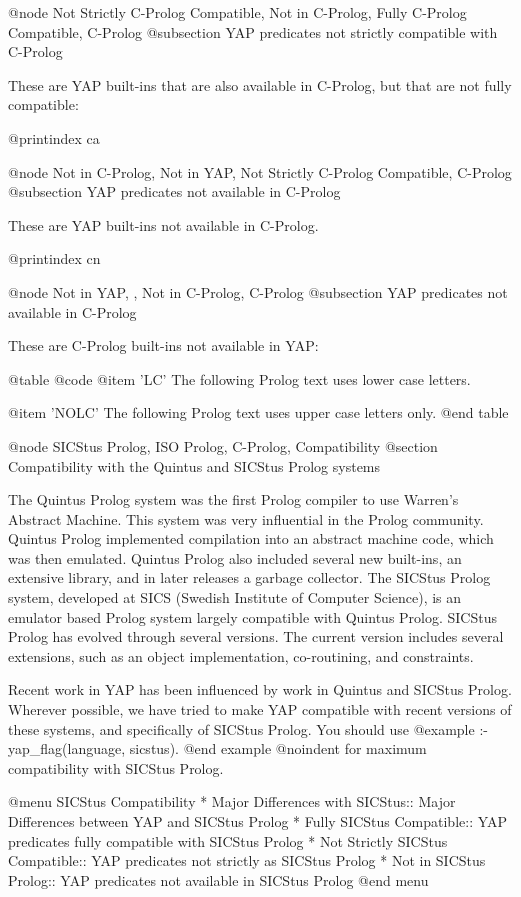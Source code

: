 {{{{{{{{{@node Not Strictly C-Prolog Compatible, Not in C-Prolog, Fully C-Prolog Compatible, C-Prolog
@subsection YAP predicates not strictly compatible with C-Prolog

These are YAP built-ins that are also available in C-Prolog, but
that are not fully compatible:

@printindex ca

@node Not in C-Prolog, Not in YAP, Not Strictly C-Prolog Compatible, C-Prolog
@subsection YAP predicates not available in C-Prolog

These are YAP built-ins not available in C-Prolog.

@printindex cn

@node Not in YAP, , Not in C-Prolog, C-Prolog
@subsection YAP predicates not available in C-Prolog

These are C-Prolog built-ins not available in YAP:

@table @code
@item 'LC'
The following Prolog text uses lower case letters.

@item 'NOLC'
The following Prolog text uses upper case letters only.
@end table

@node SICStus Prolog, ISO Prolog, C-Prolog, Compatibility
@section Compatibility with the Quintus and SICStus Prolog systems

The Quintus Prolog system was the first Prolog compiler to use Warren's
Abstract Machine. This system was very influential in the Prolog
community. Quintus Prolog implemented compilation into an abstract
machine code, which was then emulated. Quintus Prolog also included
several new built-ins, an extensive library, and in later releases a
garbage collector. The SICStus Prolog system, developed at SICS (Swedish
Institute of Computer Science), is an emulator based Prolog system
largely compatible with Quintus Prolog. SICStus Prolog has evolved
through several versions. The current version includes several
extensions, such as an object implementation, co-routining, and
constraints.

Recent work in YAP has been influenced by work in Quintus and
SICStus Prolog. Wherever possible, we have tried to make YAP
compatible with recent versions of these systems, and specifically of
SICStus Prolog. You should use 
@example
:- yap_flag(language, sicstus).
@end example
@noindent
for maximum compatibility with SICStus Prolog.

@menu
SICStus Compatibility
* Major Differences with SICStus:: Major Differences between YAP and SICStus Prolog
* Fully SICStus Compatible:: YAP predicates fully compatible with
SICStus Prolog
* Not Strictly SICStus Compatible:: YAP predicates not strictly as
SICStus Prolog
* Not in SICStus Prolog:: YAP predicates not available in SICStus Prolog
@end menu

}}}}}}}}}
